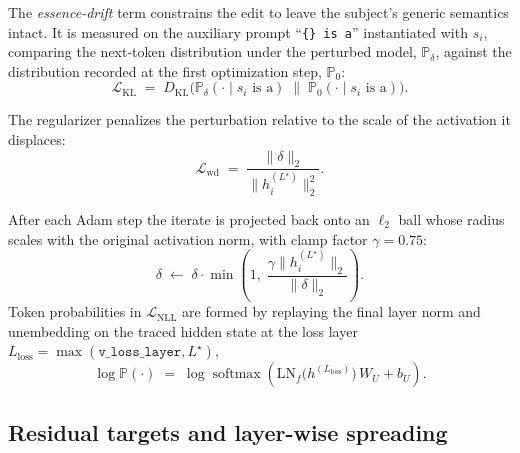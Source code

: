 The \emph{essence-drift} term constrains the edit to leave the subject's generic
semantics intact. It is measured on the auxiliary prompt ``\texttt{\{\} is a}''
instantiated with $s_i$, comparing the next-token distribution under the
perturbed model, $\mathbb{P}_\delta$, against the distribution recorded at the
first optimization step, $\mathbb{P}_0$:
%
\begin{equation}
  \mathcal{L}_{\text{KL}}
  \;=\;
  D_{\mathrm{KL}}\!\bigl(\mathbb{P}_{\delta}(\cdot \mid s_i \text{ is a})
  \;\big\|\;
  \mathbb{P}_{0}(\cdot \mid s_i \text{ is a})\bigr).
  \label{eq:kl}
\end{equation}

The regularizer penalizes the perturbation relative to the scale of the
activation it displaces:
%
\begin{equation}
  \mathcal{L}_{\text{wd}}
  \;=\;
  \frac{\lVert \delta \rVert_2}{\bigl\lVert h_i^{(L^\star)} \bigr\rVert_2^{2}}.
  \label{eq:wd}
\end{equation}
%

After each Adam step the iterate is projected back onto an $\ell_2$ ball whose
radius scales with the original activation norm, with clamp factor
$\gamma = 0.75$:
%
\begin{equation}
  \delta \;\leftarrow\;
  \delta \cdot
  \min\!\left(1,\;
  \frac{\gamma \bigl\lVert h_i^{(L^\star)} \bigr\rVert_2}
       {\lVert \delta \rVert_2}\right).
  \label{eq:clamp}
\end{equation}
%
Token probabilities in $\mathcal{L}_{\text{NLL}}$ are formed by replaying the
final layer norm and unembedding on the traced hidden state at the loss layer
$L_{\text{loss}} = \max(\texttt{v\_loss\_layer}, L^\star)$,
%
\begin{equation}
  \log \mathbb{P}(\cdot)
  \;=\;
  \log\operatorname{softmax}\!\left(
    \mathrm{LN}_f\!\bigl(h^{(L_{\text{loss}})}\bigr)\, W_U + b_U
  \right).
  \label{eq:head}
\end{equation}

\subsection{Residual targets and layer-wise spreading}
\label{sec:spread}

